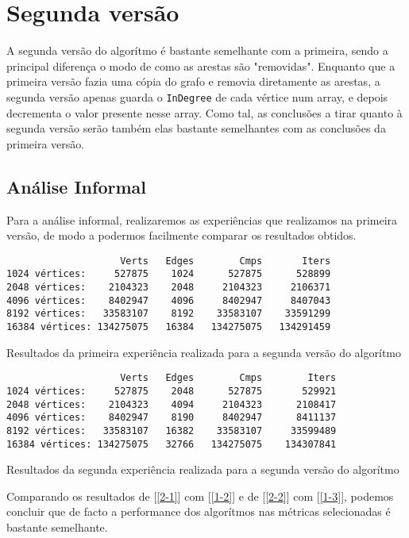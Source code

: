 \chapter{Segunda versão}

A segunda versão do algorítmo é bastante semelhante com a
primeira, sendo a principal diferença o modo de como as
arestas são "removidas". Enquanto que a primeira versão
fazia uma cópia do grafo e removia diretamente as arestas, a
segunda versão apenas guarda o \verb|InDegree| de cada
vértice num array, e depois decrementa o valor presente
nesse array. Como tal, as conclusões a tirar quanto à
segunda versão serão também elas bastante semelhantes com as
conclusões da primeira versão.


\section{Análise Informal}
Para a análise informal, realizaremos as experiências
que realizamos na primeira versão, de modo a podermos
facilmente comparar os resultados obtidos.

\begin{listing}[H]
	\centering
	\begin{verbatim}
                    Verts	Edges	     Cmps	    Iters
1024 vértices:     527875	 1024	   527875	   528899
2048 vértices:    2104323	 2048	  2104323	  2106371
4096 vértices:    8402947	 4096	  8402947	  8407043
8192 vértices:   33583107	 8192	 33583107	 33591299
16384 vértices: 134275075	16384	134275075	134291459
  \end{verbatim}
	\caption{Resultados da primeira experiência realizada para
		a segunda versão do algorítmo}
	\label{2-1}
\end{listing}

\begin{listing}[H]
	\centering
	\begin{verbatim}
                    Verts	Edges	     Cmps	     Iters
1024 vértices:     527875	 2048	   527875	    529921
2048 vértices:    2104323	 4094	  2104323	   2108417
4096 vértices:    8402947	 8190	  8402947	   8411137
8192 vértices:   33583107	16382	 33583107	  33599489
16384 vértices: 134275075	32766	134275075	 134307841
  \end{verbatim}
	\caption{Resultados da segunda experiência realizada para
		a segunda versão do algorítmo}
	\label{2-2}
\end{listing}

Comparando os resultados de [\ref{2-1}] com [\ref{1-2}] e de
	[\ref{2-2}] com [\ref{1-3}], podemos concluir que de facto a
performance dos algorítmos nas métricas selecionadas é
bastante semelhante.

